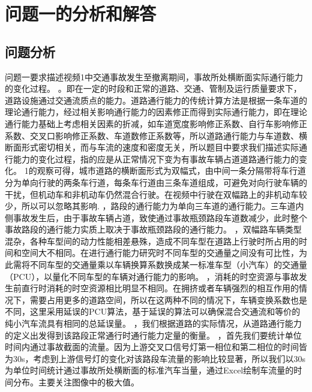 \documentclass[UTF8,12.05pt]{ctexart}
\begin{document}
\section{\heiti{}问题一的分析和解答}
\subsection{问题分析}
问题一要求描述视频1中交通事故发生至撤离期间，事故所处横断面实际通行能力的变化过程。
。即在一定的时段和正常的道路、交通、管制及运行质量要求下，道路设施通过交通流质点的能力。道路通行能力的传统计算方法是根据一条车道的理论通行能力，经过相关影响通行能力的因素修正而得到实际通行能力，即在理论通行能力基础上考虑相关因素的折减，如车道宽度影响修正系数、自行车影响修正系数、交叉口影响修正系数、车道数修正系数等，所以道路通行能力与车道数、横断面形式密切相关，而与车流的速度和密度无关，所以题目中要求我们描述实际通行能力的变化过程，指的应是从正常情况下变为有事故车辆占道道路通行能力的变化。
1的观察可得，城市道路的横断面形式为双幅式，由中间一条分隔带将车行道分为单向行驶的两条车行道，每条车行道由三条车道组成，可避免对向行驶车辆的干扰，但机动车和非机动车仍然混合行驶。在视频中行驶在双幅路上的非机动车较少，所以可以忽略其影响\cite{U49}.
，路段的通行能力为单向三车道的通行能力。三车道内侧事故发生后，由于事故车辆占道，致使通过事故瓶颈路段车道数减少，此时整个事故路段的通行能力实质上取决于事故瓶颈路段的通行能力\cite{10004}。
，双幅路车辆类型混杂，各种车型间的动力性能相差悬殊，造成不同车型在道路上行驶时所占用的时间和空间大不相同。在进行通行能力研究时不同车型的交通量之间没有可比性，为此需将不同车型的交通量乘以车辆换算系数换成某一标准车型（小汽车）的交通量（PCU），以量化不同车型的车辆对通行能力的影响\cite{1006}。
，消耗的时空资源与事故发生前直行时消耗的时空资源相比明显不相同。在拥挤或者车辆强烈的相互作用的情况下，需要占用更多的道路空间，所以在这两种不同的情况下，车辆变换系数也是不同，这里采用延误的PCU算法，基于延误的算法可以确保混合交通流和等价的纯小汽车流具有相同的总延误量\cite{U492}。
，我们根据道路的实际情况，从道路通行能力的定义出发得到该路段正常通行时通行能力定量的衡量。
，首先我们要统计单位时间内通过事故截面的流量。因为上游交叉口信号灯第一相位和第二相位的时间皆为30s，考虑到上游信号灯的变化对该路段车流量的影响比较显著，所以我们以30s为单位时间统计通过事故所处横断面的标准汽车当量，通过Excel绘制车流量的时间分布。主要关注图像中的极大值。
\end{document}
